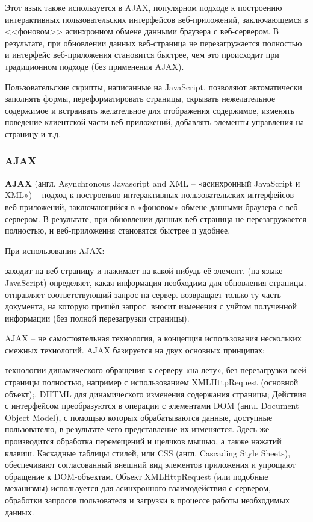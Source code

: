 \documentclass[a4paper]{article}
\begin{document}
Этот язык также используется в AJAX, популярном подходе к построению интерактивных пользовательских интерфейсов веб-приложений, заключающемся в <<фоновом>> асинхронном обмене данными браузера с веб-сервером. В результате, при обновлении данных веб-страница не перезагружается полностью и интерфейс веб-приложения становится быстрее, чем это происходит при традиционном подходе (без применения AJAX).

Пользовательские скрипты, написанные на JavaScript, позволяют автоматически заполнять формы, переформатировать страницы, скрывать нежелательное содержимое и встраивать желательное для отображения содержимое, изменять поведение клиентской части веб-приложений, добавлять элементы управления на страницу и т.д.

\subsubsection{AJAX}

\textbf{AJAX} (англ. Asynchronous Javascript and XML -- «асинхронный JavaScript и XML») -- подход к построению интерактивных пользовательских интерфейсов веб-приложений, заключающийся в «фоновом» обмене данными браузера с веб-сервером. В результате, при обновлении данных веб-страница не перезагружается полностью, и веб-приложения становятся быстрее и удобнее.

При использовании AJAX:

\begin{itemize}
 заходит на веб-страницу и нажимает на какой-нибудь её элемент.
 (на языке JavaScript) определяет, какая информация необходима для обновления страницы.
 отправляет соответствующий запрос на сервер.
 возвращает только ту часть документа, на которую пришёл запрос.
 вносит изменения с учётом полученной информации (без полной перезагрузки страницы).
\end{itemize}

AJAX -- не самостоятельная технология, а концепция использования нескольких смежных технологий. AJAX базируется на двух основных принципах:

\begin{itemize}
 технологии динамического обращения к серверу «на лету», без перезагрузки всей страницы полностью, например с использованием XMLHttpRequest (основной объект);.
 DHTML для динамического изменения содержания страницы;
Действия с интерфейсом преобразуются в операции с элементами DOM (англ. Document Object Model), с помощью которых обрабатываются данные, доступные пользователю, в результате чего представление их изменяется. Здесь же производится обработка перемещений и щелчков мышью, а также нажатий клавиш. Каскадные таблицы стилей, или CSS (англ. Cascading Style Sheets), обеспечивают согласованный внешний вид элементов приложения и упрощают обращение к DOM-объектам. Объект XMLHttpRequest (или подобные механизмы) используется для асинхронного взаимодействия с сервером, обработки запросов пользователя и загрузки в процессе работы необходимых данных.
\end{itemize}
\end{document}
